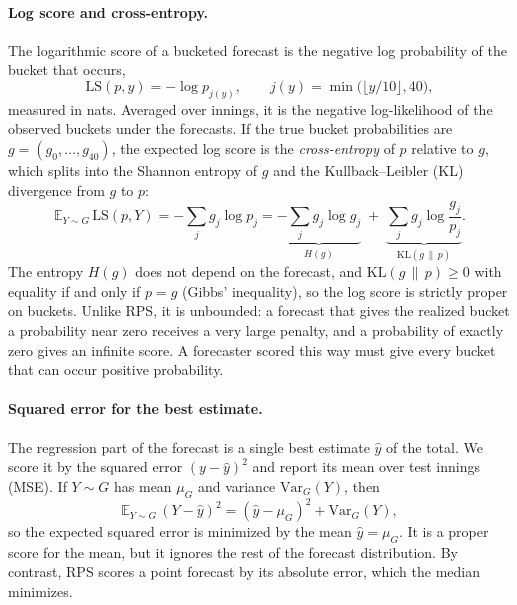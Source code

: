 \documentclass{article}
\newcommand{\1}{\mathbf{1}}
\newcommand{\E}{\mathbb{E}}
\begin{document}
\paragraph{Log score and cross-entropy.} The logarithmic score \citep{gneiting2007} of a bucketed forecast is the negative log probability of the bucket that occurs,
\begin{equation}\label{eq:log}
\mathrm{LS}(p, y) = -\log p_{j(y)}, \qquad j(y) = \min\big(\lfloor y/10 \rfloor, 40\big),
\end{equation}
measured in nats. Averaged over innings, it is the negative log-likelihood of the observed buckets under the forecasts. If the true bucket probabilities are $g = (g_0, \dots, g_{40})$, the expected log score is the \emph{cross-entropy} of $p$ relative to $g$, which splits into the Shannon entropy of $g$ and the Kullback--Leibler (KL) divergence from $g$ to $p$:
\begin{equation}\label{eq:crossent}
\E_{Y \sim G}\,\mathrm{LS}(p, Y) = -\sum_{j} g_j \log p_j = \underbrace{-\sum_{j} g_j \log g_j}_{H(g)} \;+\; \underbrace{\sum_{j} g_j \log \frac{g_j}{p_j}}_{\mathrm{KL}(g \,\|\, p)}.
\end{equation}
The entropy $H(g)$ does not depend on the forecast, and $\mathrm{KL}(g \,\|\, p) \ge 0$ with equality if and only if $p = g$ (Gibbs' inequality), so the log score is strictly proper on buckets. Unlike RPS, it is unbounded: a forecast that gives the realized bucket a probability near zero receives a very large penalty, and a probability of exactly zero gives an infinite score. A forecaster scored this way must give every bucket that can occur positive probability.

\paragraph{Squared error for the best estimate.} The regression part of the forecast is a single best estimate $\hat y$ of the total. We score it by the squared error $(y - \hat y)^2$ and report its mean over test innings (MSE). If $Y \sim G$ has mean $\mu_G$ and variance $\mathrm{Var}_G(Y)$, then
\begin{equation}\label{eq:se}
\E_{Y \sim G}\,(Y - \hat y)^2 = (\hat y - \mu_G)^2 + \mathrm{Var}_G(Y),
\end{equation}
so the expected squared error is minimized by the mean $\hat y = \mu_G$. It is a proper score for the mean, but it ignores the rest of the forecast distribution. By contrast, RPS scores a point forecast by its absolute error, which the median minimizes.
\end{document}
